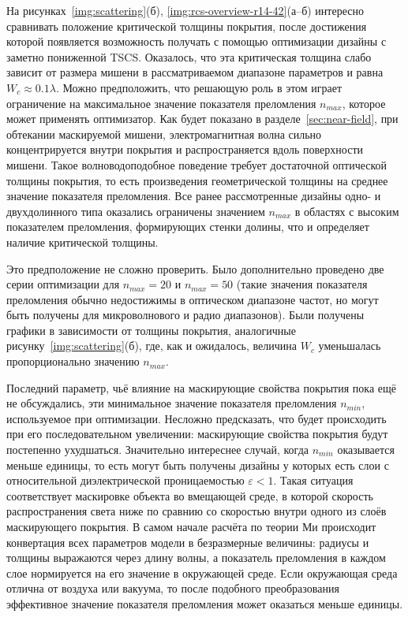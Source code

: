 На рисунках~\ref{img:scattering}(б),
\ref{img:rcs-overview-r14-42}(а--б) интересно сравнивать положение
критической толщины покрытия, после достижения которой появляется
возможность получать с помощью оптимизации дизайны с заметно
пониженной TSCS.  Оказалось, что эта критическая толщина слабо зависит
от размера мишени в рассматриваемом диапазоне параметров и равна
${W_c \approx 0.1\lambda}$.  Можно предположить, что решающую роль в
этом играет ограничение на максимальное значение показателя
преломления $n_{max}$, которое может применять оптимизатор.  Как будет
показано в разделе~\ref{sec:near-field}, при обтекании маскируемой
мишени, электромагнитная волна сильно концентрируется внутри покрытия
и распространяется вдоль поверхности мишени.  Такое волноводоподобное
поведение требует достаточной оптической толщины покрытия, то есть
произведения геометрической толщины на среднее значение показателя
преломления. Все ранее рассмотренные дизайны одно- и двухдолинного
типа оказались ограничены значением $n_{max}$ в областях с высоким
показателем преломления, формирующих стенки долины, что и определяет
наличие критической толщины.

Это предположение не сложно проверить. Было дополнительно проведено
две серии оптимизации для $n_{max}=20$ и $n_{max}=50$ (такие значения
показателя преломления обычно недостижимы в оптическом диапазоне
частот, но могут быть получены для микроволнового и радио диапазонов).
Были получены графики в зависимости от толщины покрытия, аналогичные
рисунку~\ref{img:scattering}(б), где, как и ожидалось, величина $W_c$
уменьшалась пропорционально значению $n_{max}$.

Последний параметр, чьё влияние на маскирующие свойства покрытия пока
ещё не обсуждались, эти минимальное значение показателя преломления
$n_{min}$, используемое при оптимизации.  Несложно предсказать, что
будет происходить при его последовательном увеличении: маскирующие
свойства покрытия будут постепенно ухудшаться.  Значительно интереснее
случай, когда $n_{min}$ оказывается меньше единицы, то есть могут быть
получены дизайны у которых есть слои с относительной диэлектрической
проницаемостью $\varepsilon <1$.  Такая ситуация соответствует
маскировке объекта во вмещающей среде, в которой скорость
распространения света ниже по сравнию со скоростью внутри одного из
слоёв маскирующего покрытия.  В самом начале расчёта по теории Ми
происходит конвертация всех параметров модели в безразмерные величины:
радиусы и толщины выражаются через длину волны, а показатель
преломления в каждом слое нормируется на его значение в окружающей
среде. Если окружающая среда отлична от воздуха или вакуума, то после
подобного преобразования эффективное значение показателя преломления
может оказаться меньше единицы.


